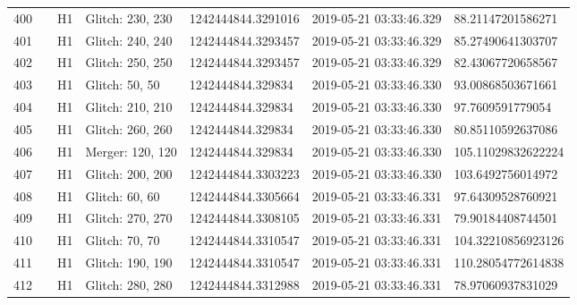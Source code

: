 \begin{longtable}{lllllll}
400  &                                                    &       H1 &  Glitch: 230, 230 &  1242444844.3291016 &  2019-05-21 03:33:46.329 &   88.21147201586271 \\
401  &                                                    &       H1 &  Glitch: 240, 240 &  1242444844.3293457 &  2019-05-21 03:33:46.329 &   85.27490641303707 \\
402  &                                                    &       H1 &  Glitch: 250, 250 &  1242444844.3293457 &  2019-05-21 03:33:46.329 &   82.43067720658567 \\
403  &                                                    &       H1 &    Glitch: 50, 50 &   1242444844.329834 &  2019-05-21 03:33:46.330 &   93.00868503671661 \\
404  &                                                    &       H1 &  Glitch: 210, 210 &   1242444844.329834 &  2019-05-21 03:33:46.330 &    97.7609591779054 \\
405  &                                                    &       H1 &  Glitch: 260, 260 &   1242444844.329834 &  2019-05-21 03:33:46.330 &   80.85110592637086 \\
406  &                                                    &       H1 &  Merger: 120, 120 &   1242444844.329834 &  2019-05-21 03:33:46.330 &  105.11029832622224 \\
407  &                                                    &       H1 &  Glitch: 200, 200 &  1242444844.3303223 &  2019-05-21 03:33:46.330 &   103.6492756014972 \\
408  &                                                    &       H1 &    Glitch: 60, 60 &  1242444844.3305664 &  2019-05-21 03:33:46.331 &   97.64309528760921 \\
409  &                                                    &       H1 &  Glitch: 270, 270 &  1242444844.3308105 &  2019-05-21 03:33:46.331 &   79.90184408744501 \\
410  &                                                    &       H1 &    Glitch: 70, 70 &  1242444844.3310547 &  2019-05-21 03:33:46.331 &  104.32210856923126 \\
411  &                                                    &       H1 &  Glitch: 190, 190 &  1242444844.3310547 &  2019-05-21 03:33:46.331 &  110.28054772614838 \\
412  &                                                    &       H1 &  Glitch: 280, 280 &  1242444844.3312988 &  2019-05-21 03:33:46.331 &   78.97060937831029 \\

\end{longtable}
